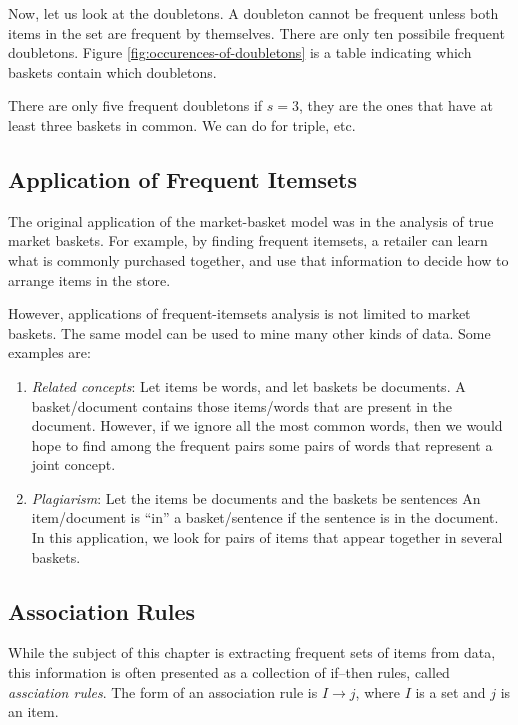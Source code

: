 Now, let us look at the doubletons. A doubleton cannot be frequent unless both items in the set are frequent by themselves. There are only ten possibile frequent doubletons. Figure \ref{fig:occurences-of-doubletons} is a table indicating which baskets contain which doubletons.

There are only five frequent doubletons if $s = 3$, they are the ones that have at least three baskets in common. We can do for triple, etc. 

\subsection{Application of Frequent Itemsets}\label{subsec:application-of-frequent-itemsets}

The original application of the market-basket model was in the analysis of true market baskets. For example, by finding frequent itemsets, a retailer can learn what is commonly purchased together, and use that information to decide how to arrange items in the store.

However, applications of frequent-itemsets analysis is not limited to market baskets. The same model can be used to mine many other kinds of data. Some examples are:

\begin{enumerate}
    \item \textit{Related concepts}: Let items be words, and let baskets be documents. A basket/document contains those items/words that are present in the document. However, if we ignore all the most common words, then we would hope to find among the frequent pairs some pairs of words that represent a joint concept.
    \item \textit{Plagiarism}: Let the items be documents and the baskets be sentences An item/document is ``in'' a basket/sentence if the sentence is in the document. In this application, we
look for pairs of items that appear together in several baskets.
\end{enumerate}

\subsection{Association Rules}\label{subsec:association-rules}

While the subject of this chapter is extracting frequent sets of items from data, this information is often presented as a collection of if–then rules, called \textit{assciation rules}. The form of an association rule is $I \rightarrow j$, where $I$ is a set and $j$ is an item. 

